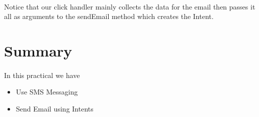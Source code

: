 \paragraph{} Notice that our click handler mainly collects the data for the email then passes it all as arguments to the sendEmail method which creates the Intent.


\section{Summary}
\paragraph{} In this practical we have 

\begin{itemize}
\item Use SMS Messaging
\item Send Email using Intents
\end{itemize}


